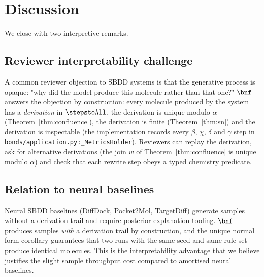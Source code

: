 \section{Discussion}
\label{sec:discussion}
We close with two interpretive remarks.

\subsection{Reviewer interpretability challenge}
A common reviewer objection to SBDD systems is that the generative process
is opaque: "why did the model produce this molecule rather than that one?"
$\bnf$ answers the objection by construction: every molecule produced by
the system has a \emph{derivation} in $\stepstoAll$, the derivation is
unique modulo $\alpha$ (Theorem~\ref{thm:confluence}), the derivation is
finite (Theorem~\ref{thm:sn}) and the derivation is inspectable (the
implementation records every $\beta$, $\chi$, $\delta$ and $\gamma$ step
in \texttt{bonds/application.py:\_MetricsHolder}). Reviewers can replay
the derivation, ask for alternative derivations (the join $w$ of
Theorem~\ref{thm:confluence} is unique modulo $\alpha$) and check that
each rewrite step obeys a typed chemistry predicate.

\subsection{Relation to neural baselines}
Neural SBDD baselines (DiffDock, Pocket2Mol, TargetDiff) generate samples
without a derivation trail and require posterior explanation tooling.
$\bnf$ produces samples \emph{with} a derivation trail by construction,
and the unique normal form corollary guarantees that two runs with the
same seed and same rule set produce identical molecules. This is the
interpretability advantage that we believe justifies the slight sample
throughput cost compared to amortised neural baselines.

